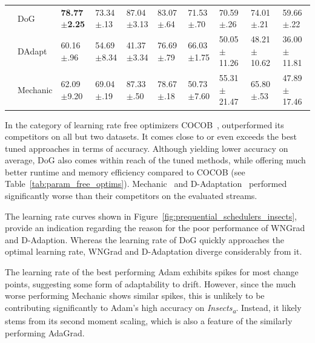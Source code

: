 \documentclass{article} %
\begin{document}
\begin{table}[ht]
\begin{tabular}{llllllllll}
                                                         & DoG       & \bfseries 78.77$\pm$2.25 & 73.34$\pm$.13           & 87.04$\pm$3.13           & 83.07$\pm$.64           & 71.53$\pm$.70           & 70.59$\pm$.26            & 74.01$\pm$.21            & 59.66$\pm$.22            \\
                                                         & DAdapt    & 60.16$\pm$.96            & 54.69$\pm$8.34          & 41.37$\pm$3.34           & 76.69$\pm$.79           & 66.03$\pm$1.75          & 50.05$\pm$11.26          & 48.21$\pm$10.62          & 36.00$\pm$11.81          \\
                                                         & Mechanic  & 62.09$\pm$9.20           & 69.04$\pm$.19           & 87.33$\pm$.50            & 78.67$\pm$.18           & 50.73$\pm$7.60          & 55.31$\pm$21.47          & 65.80$\pm$.53            & 47.89$\pm$17.46          \\
      \bottomrule
   \end{tabular}
   \label{tab:results_adaptive_optims}
\end{table}
In the category of learning rate free optimizers COCOB~\citep{orabonaTrainingDeepNetworks2017}, outperformed its competitors on all but two datasets.
It comes close to or even exceeds the best tuned approaches in terms of accuracy.
Although yielding lower accuracy on average, DoG also comes within reach of the tuned methods, while offering much better runtime and memory efficiency compared to COCOB (see Table~\ref{tab:param_free_optims}).
Mechanic~\citep{cutkoskyMechanicLearningRate2023} and D-Adaptation~\citep{defazioLearningRateFreeLearningDAdaptation2023a} performed significantly worse than their competitors on the evaluated streams.

The learning rate curves shown in Figure~\ref{fig:prequential_schedulers_insects}, provide an indication regarding the reason for the poor performance of WNGrad and D-Adaption.
Whereas the learning rate of DoG quickly approaches the optimal learning rate, WNGrad and D-Adaptation diverge considerably from it.

The learning rate of the best performing Adam exhibits spikes for most change points, suggesting some form of adaptability to drift.
However, since the much worse performing Mechanic shows similar spikes, this is unlikely to be contributing significantly to Adam's high accuracy on \textit{Insects\textsubscript{a}}.
Instead, it likely stems from its second moment scaling, which is also a feature of the similarly performing AdaGrad.
\end{document}
